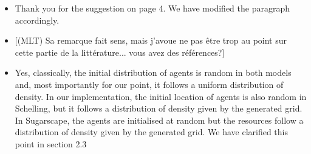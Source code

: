 \documentclass[11pt,a4paper,sans]{moderncv}        %
\begin{document}
\begin{itemize}
	\item Thank you for the suggestion on page 4. We have modified the paragraph accordingly.


	\item 
    [(MLT) Sa remarque fait sens, mais j'avoue ne pas être trop au point sur cette partie de la littérature... vous avez des références?]
	
	\item Yes, classically, the initial distribution of agents is random in both models and, most importantly for our point, it follows a uniform distribution of density. In our implementation, the initial location of agents is also random in Schelling, but it follows a distribution of density given by the generated grid. In Sugarscape, the agents are initialised at random but the resources follow a distribution of density given by the generated grid. We have clarified this point in section 2.3
           

\end{itemize}
\end{document}
